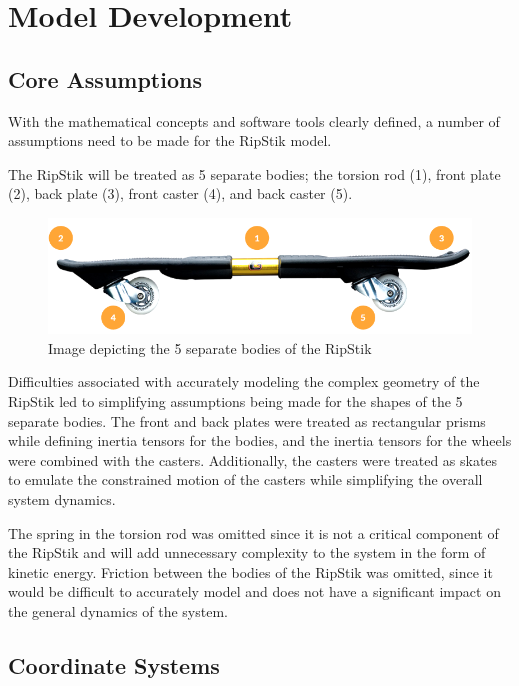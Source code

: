 \section{Model Development}
\subsection{Core Assumptions}

With the mathematical concepts and software tools clearly defined, a number of assumptions need to be made for the RipStik model.
\par
The RipStik will be treated as 5 separate bodies; the torsion rod (1), front plate (2), back plate (3), front caster (4), and back caster (5).

\begin{figure}[!htb]
	\centering
	\includegraphics[width=\linewidth]{RipStikModel.png}
	\caption{Image depicting the 5 separate bodies of the RipStik}\label{fig:RipStikModel}
	\endminipage
\end{figure}  

Difficulties associated with accurately modeling the complex geometry of the RipStik led to simplifying assumptions being made for the shapes of the 5 separate bodies.
The front and back plates were treated as rectangular prisms while defining inertia tensors for the bodies, and the inertia tensors for the wheels were combined with the casters. 
Additionally, the casters were treated as skates to emulate the constrained motion of the casters while simplifying the overall system dynamics.
\par
The spring in the torsion rod was omitted since it is not a critical component of the RipStik and will add unnecessary complexity to the system in the form of kinetic energy.
Friction between the bodies of the RipStik was omitted, since it would be difficult to accurately model and does not have a significant impact on the general dynamics of the system.

\subsection{Coordinate Systems}

